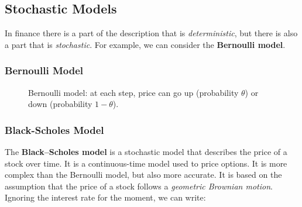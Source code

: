 \documentclass[11pt,a4paper]{article}
\theoremstyle{definition}
\theoremstyle{plain}
\theoremstyle{remark}
\begin{document}
\subsection{Stochastic Models}
In finance there is a part of the description that is \emph{deterministic}, but there is also a part that is \emph{stochastic}.
For example, we can consider the \textbf{Bernoulli model}.
\subsubsection{Bernoulli Model}
\begin{figure}[h!]
    \centering
    \caption{Bernoulli model: at each step, price can go up (probability $\theta$) or down (probability $1{-}\theta$).}
\end{figure}

\subsubsection{Black-Scholes Model}
The \textbf{Black--Scholes model} is a stochastic model that describes the price of a stock over time.
It is a continuous-time model used to price options.
It is more complex than the Bernoulli model, but also more accurate.
It is based on the assumption that the price of a stock follows a \emph{geometric Brownian motion}.
Ignoring the interest rate for the moment, we can write:
\end{document}
